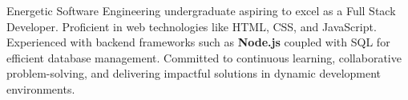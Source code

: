 

\begin{cvparagraph}

Energetic Software Engineering undergraduate aspiring to excel as a Full Stack Developer. Proficient in web technologies like HTML, CSS, and JavaScript. Experienced with backend frameworks such as \textbf{Node.js} coupled with SQL for efficient database management. Committed to continuous learning, collaborative problem-solving, and delivering impactful solutions in dynamic development environments.
\end{cvparagraph}
